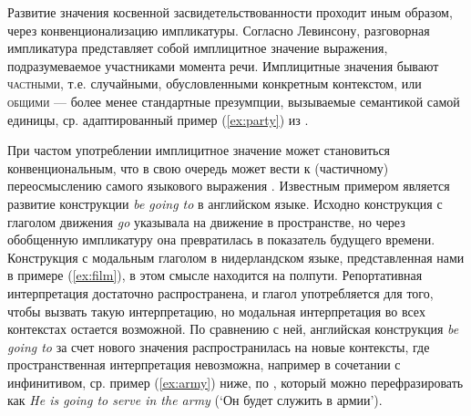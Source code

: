 \par Развитие значения косвенной засвидетельствованности проходит иным образом, через конвенционализацию импликатуры. Согласно Левинсону, разговорная импликатура представляет собой имплицитное значение выражения, подразумеваемое участниками момента речи. 
Имплицитные значения бывают \textsc{частными}, т.е. случайными, обусловленными конкретным контекстом, или \textsc{общими} --- более менее стандартные презумпции, вызываемые семантикой самой единицы, ср. адаптированный пример (\ref{ex:party}) из \citep[16]{levinson2000}.

При частом употреблении имплицитное значение может становиться конвенциональным, что в свою очередь может вести к (частичному) переосмыслению самого языкового выражения \citep[81--82]{hoppertraugott2003}. Известным примером является развитие конструкции \textit{be going to} в английском языке. Исходно конструкция с глаголом движения \textit{go} указывала на движение в пространстве, но через обобщенную импликатуру она превратилась в показатель будущего времени. Конструкция с модальным глаголом в нидерландском языке, представленная нами в примере (\ref{ex:film}), в этом смысле находится на полпути. Репортативная интерпретация достаточно распространена, и глагол употребляется для того, чтобы вызвать такую интерпретацию, но модальная интерпретация во всех контекстах остается возможной. По сравнению с ней, английская конструкция \textit{be going to} за счет нового значения распространилась на новые контексты, где пространственная интерпретация невозможна, например в сочетании с инфинитивом, ср. пример (\ref{ex:army}) ниже, по \citep[263]{levinson2000}, который можно перефразировать как \textit{He is going to serve in the army} (`Он будет служить в армии'). 

